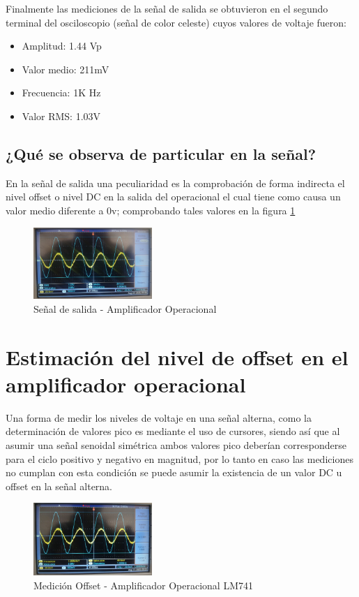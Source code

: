 \documentclass[conference]{IEEEtran}
\begin{document}
	Finalmente las mediciones de la señal de salida se obtuvieron en el segundo terminal del osciloscopio (señal de color celeste) cuyos valores de voltaje fueron:
	
	\begin{itemize}
		\item Amplitud: 1.44 Vp
		\item Valor medio: 211mV
		\item Frecuencia: 1K Hz
		\item Valor RMS: 1.03V
	\end{itemize}
	
	\subsection{¿Qué se observa de particular en la señal?}
	En la señal de salida una peculiaridad es la comprobación de forma indirecta el nivel offset o nivel DC en la salida del operacional el cual tiene como causa un valor medio diferente a 0v; comprobando tales valores en la figura \ref{fig:salida-operacional}
	
	\begin{figure}[h]
		\centering
		\includegraphics[width=0.4\textwidth]{media/salida-operacional}
		\caption{Señal de salida - Amplificador Operacional}
		\label{fig:salida-operacional}
	\end{figure}
	
	\section{Estimación del nivel de offset en el amplificador operacional}
	
	Una forma de medir los niveles de voltaje en una señal alterna, como la determinación de valores pico es mediante el uso de cursores, siendo así que al asumir una señal senoidal simétrica ambos valores pico deberían corresponderse para el ciclo positivo y negativo en magnitud, por lo tanto en caso las mediciones no cumplan con esta condición se puede asumir la existencia de un valor DC u offset en la señal alterna.
	
	\begin{figure}[h]
		\centering
		\includegraphics[width=0.4\textwidth]{media/offset-741}
		\caption{Medición Offset - Amplificador Operacional LM741}
		\label{fig:offset-741}
	\end{figure}
	
\end{document}
